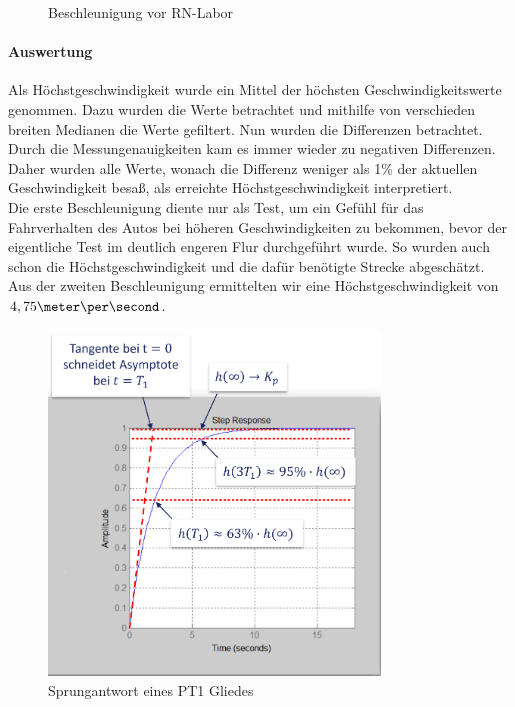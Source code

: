 \documentclass[a4paper,12pt]{report}
\begin{document}
	\begin{figure}[ht]
		\centering

		\caption{Beschleunigung vor RN-Labor}
		\label{img-accelleration2}
	\end{figure}

	\paragraph{Auswertung}
	Als Höchstgeschwindigkeit wurde ein Mittel der höchsten Geschwindigkeitswerte genommen.
	Dazu wurden die Werte betrachtet und mithilfe von verschieden breiten Medianen die Werte gefiltert.
	Nun wurden die Differenzen betrachtet.
	Durch die Messungenauigkeiten kam es immer wieder zu negativen Differenzen.
	Daher wurden alle Werte, wonach die Differenz weniger als 1\% der aktuellen Geschwindigkeit besaß, als erreichte Höchstgeschwindigkeit interpretiert.
	\\
	Die erste Beschleunigung diente nur als Test, um ein Gefühl für das Fahrverhalten des Autos bei höheren Geschwindigkeiten zu bekommen, bevor der eigentliche Test im deutlich engeren Flur durchgeführt wurde.
	So wurden auch schon die Höchstgeschwindigkeit und die dafür benötigte Strecke abgeschätzt.
	\\
	Aus der zweiten Beschleunigung ermittelten wir eine Höchstgeschwindigkeit von $4,75 \meter\per\second$.
	\begin{figure}[ht]
		\centering
		\includegraphics[width=250pt,keepaspectratio]{assets/PT1-Sprungantwort.PNG}
		\caption{Sprungantwort eines PT1 Gliedes}
		\label{img-PT1-Sprungantwort}
	\end{figure}\\
\end{document}
